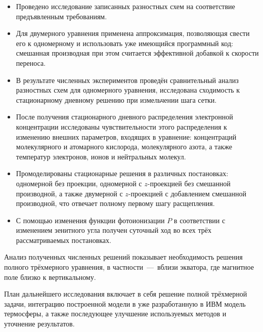\documentclass[14pt, a4paper, fleqn]{extarticle}
\begin{document}
\begin{itemize}
\item 
Проведено исследование записанных разностных схем на соответствие предъявленным требованиям.

\item 
Для двумерного уравнения применена аппроксимация, позволяющая свести его к одномерному и использовать уже имеющийся программный код: смешанная производная при этом считается эффективной добавкой к скорости переноса.

\item
В результате численных экспериментов проведён сравнительный анализ разностных схем для одномерного уравнения, исследована сходимость к стационарному дневному решению при измельчении шага сетки.

\item 
После получения стационарного дневного распределения электронной концентрации исследованы чувствительности этого распределения к изменению внешних параметров, входящих в уравнение: концентраций молекулярного и атомарного кислорода, молекулярного азота, а также температур электронов, ионов и нейтральных молекул.

\item
Промоделированы стационарные решения в различных постановках: одномерной без проекции, одномерной с $z$-проекцией без смешанной производной, а также двумерной с $z$-проекцией с добавлением смешанной производной, что отвечает полному первому шагу расщепления.

\item
С помощью изменения функции фотоионизации $P$ в соответствии с изменением зенитного угла получен суточный ход во всех трёх рассматриваемых постановках.

\end{itemize} 

Анализ полученных численных решений показывает необходимость решения полного трёхмерного уравнения, в частности~---~вблизи экватора, где магнитное поле близко к вертикальному.

План дальнейшего исследования включает в себя решение полной трёхмерной задачи, интеграцию построенной модели в уже разработанную в ИВМ модель термосферы, а также последующее улучшение используемых методов и уточнение результатов.

\newpage
{}
\end{document}
